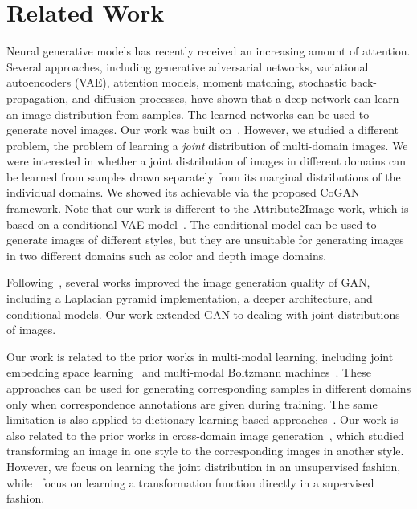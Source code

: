 \section{Related Work}\label{sec::rel}

Neural generative models has recently received an increasing amount of attention. Several approaches, including generative adversarial networks\cite{goodfellow2014generative}, variational autoencoders (VAE)\cite{kingma2013auto}, attention models\cite{gregor2015draw}, moment matching\cite{li2015generative}, stochastic back-propagation\cite{rezende2014stochastic}, and diffusion processes\cite{sohl2015deep}, have shown that a deep network can learn an image distribution from samples. The learned networks can be used to generate novel images. Our work was built on~\cite{goodfellow2014generative}. However, we studied a different problem, the problem of learning a {\it joint} distribution of multi-domain images. We were interested in whether a joint distribution of images in different domains can be learned from samples drawn separately from its marginal distributions of the individual domains. We showed its achievable via the proposed CoGAN framework. Note that our work is different to the Attribute2Image work\cite{yan2015attribute2image}, which is based on a conditional VAE model~\cite{kingma2014semi}. The conditional model can be used to generate images of different styles, but they are unsuitable for generating images in two different domains such as color and depth image domains.

Following~\cite{goodfellow2014generative}, several works improved the image generation quality of GAN, including a Laplacian pyramid implementation\cite{denton2015deep}, a deeper architecture\cite{radford2015unsupervised}, and conditional models\cite{mirza2014conditional}. Our work extended GAN to dealing with joint distributions of images.

Our work is related to the prior works in multi-modal learning, including joint embedding space learning~\cite{kiros2014unifying} and multi-modal Boltzmann machines~\cite{srivastava2012multimodal,ngiam2011multimodal}. These approaches can be used for generating corresponding samples in different domains only when correspondence annotations are given during training. The same limitation is also applied to dictionary learning-based approaches~\cite{wang2012semi,yang2010image}. Our work is also related to the prior works in cross-domain image generation~\cite{yim2015rotating,reed2015deep,dosovitskiy2015learning}, which studied transforming an image in one style to the corresponding images in another style. However, we focus on learning the joint distribution in an unsupervised fashion, while~\cite{yim2015rotating,reed2015deep,dosovitskiy2015learning} focus on learning a transformation function directly in a supervised fashion.

